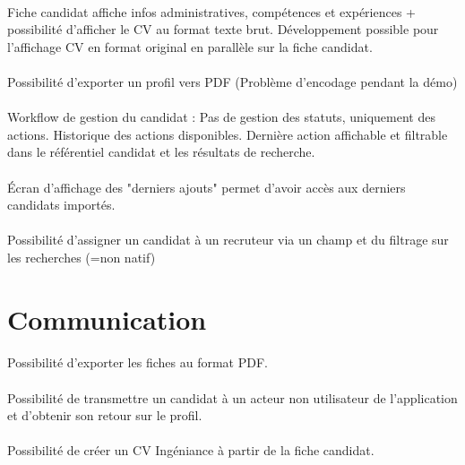 \documentclass[12pt,twoside]{scrreprt}
\begin{document}
\paragraph{} Fiche candidat affiche infos administratives, compétences et expériences + possibilité d'afficher le CV au format texte brut. Développement possible pour l'affichage CV en format original en parallèle sur la fiche candidat. 
\paragraph{} Possibilité d'exporter un profil vers PDF (Problème d'encodage pendant la démo)
\paragraph{} Workflow de gestion du candidat : Pas de gestion des statuts, uniquement des actions. Historique des actions disponibles. Dernière action affichable et filtrable dans le référentiel candidat et les résultats de recherche.
\paragraph{} Écran d'affichage des "derniers ajouts" permet d'avoir accès aux derniers candidats importés.
\paragraph{} Possibilité d'assigner un candidat à un recruteur via un champ et du filtrage sur les recherches (=non natif)



\section{Communication}
\paragraph{} Possibilité d'exporter les fiches au format PDF.
\paragraph{} Possibilité de transmettre un candidat à un acteur non utilisateur de l'application et d'obtenir son retour sur le profil.
\paragraph{} Possibilité de créer un CV Ingéniance à partir de la fiche candidat.
\end{document}
